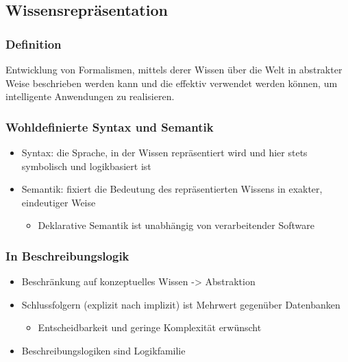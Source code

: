 \subsection{Wissensrepräsentation}\label{wissensrepruxe4sentation}

\subsubsection{Definition}\label{definition}

Entwicklung von Formalismen, mittels derer Wissen über die Welt in
abstrakter Weise beschrieben werden kann und die effektiv verwendet
werden können, um intelligente Anwendungen zu realisieren.

\subsubsection{Wohldefinierte Syntax und
Semantik}\label{wohldefinierte-syntax-und-semantik}

\begin{itemize}
\item
  Syntax: die Sprache, in der Wissen repräsentiert wird und hier stets
  symbolisch und logikbasiert ist
\item
  Semantik: fixiert die Bedeutung des repräsentierten Wissens in
  exakter, eindeutiger Weise

  \begin{itemize}
  \item
    Deklarative Semantik ist unabhängig von verarbeitender Software
  \end{itemize}
\end{itemize}

\subsubsection{In Beschreibungslogik}\label{in-beschreibungslogik}

\begin{itemize}
\item
  Beschränkung auf konzeptuelles Wissen -\textgreater{} Abstraktion
\item
  Schlussfolgern (explizit nach implizit) ist Mehrwert gegenüber
  Datenbanken

  \begin{itemize}
  \item
    Entscheidbarkeit und geringe Komplexität erwünscht
  \end{itemize}
\item
  Beschreibungslogiken sind Logikfamilie
\end{itemize}